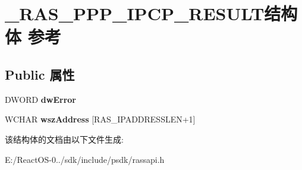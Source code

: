 \hypertarget{struct___r_a_s___p_p_p___i_p_c_p___r_e_s_u_l_t}{}\section{\+\_\+\+R\+A\+S\+\_\+\+P\+P\+P\+\_\+\+I\+P\+C\+P\+\_\+\+R\+E\+S\+U\+L\+T结构体 参考}
\label{struct___r_a_s___p_p_p___i_p_c_p___r_e_s_u_l_t}
\subsection*{Public 属性}
\begin{DoxyCompactItemize}
\item 
\mbox{\label{struct___r_a_s___p_p_p___i_p_c_p___r_e_s_u_l_t_a574d3c678843354b2a59d9cd8ca4e8b9}} 
D\+W\+O\+RD {\bfseries dw\+Error}
\item 
\mbox{\label{struct___r_a_s___p_p_p___i_p_c_p___r_e_s_u_l_t_aff68926e8bd897093583341ea90a836f}} 
W\+C\+H\+AR {\bfseries wsz\+Address} \mbox{[}R\+A\+S\+\_\+\+I\+P\+A\+D\+D\+R\+E\+S\+S\+L\+EN+1\mbox{]}
\end{DoxyCompactItemize}


该结构体的文档由以下文件生成\+:\begin{DoxyCompactItemize}
\item 
E\+:/\+React\+O\+S-\/0../sdk/include/psdk/rassapi.\+h\end{DoxyCompactItemize}
